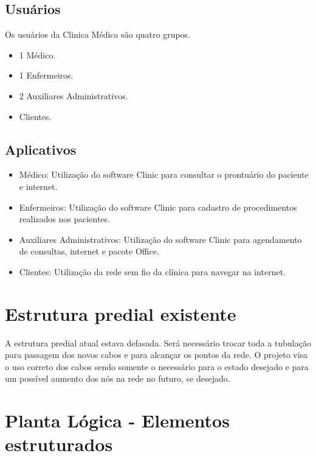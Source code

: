 \documentclass[	DIV=calc,%
							paper=a4,%
							fontsize=12pt,%
							onecolumn]{scrartcl}	 					%
\begin{document}
\subsection{Usuários}
Os usuários da Clinica Médica são quatro grupos.
\begin{itemize}
	\item 1 Médico.
	\item 1 Enfermeiros.
	\item 2 Auxiliares Administrativos.
	\item Clientes.
\end{itemize} 



\subsection{Aplicativos}

\begin{itemize}
	\item Médico: Utilização do software Clinic para consultar o prontuário do paciente e internet.
	\item Enfermeiros: Utilização do software Clinic para cadastro de procedimentos realizados nos pacientes.
	\item  Auxiliares Administrativos: Utilização do software Clinic para agendamento de consultas, internet e pacote Office.
	\item Clientes:
	Utilização da rede sem fio da clínica para navegar na internet.
\end{itemize}

\section{Estrutura predial existente}

A estrutura predial atual estava defasada. Será necessário trocar toda a tubulação para passagem dos novos cabos e para alcançar os pontos da rede. O projeto visa o uso correto dos cabos sendo somente o necessário para o estado desejado e para um possível aumento dos nós na rede no futuro, se desejado.


\section{Planta Lógica - Elementos estruturados}
\end{document}
